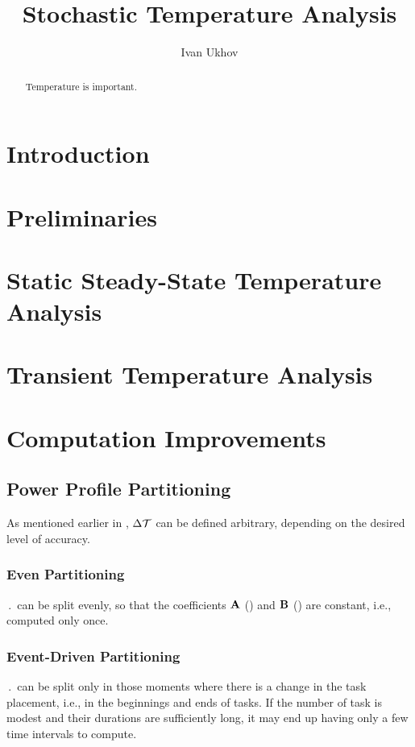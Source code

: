 \documentclass[conference]{IEEEtran}
\begin{document}
  \title{Stochastic Temperature Analysis}
  \author{Ivan Ukhov}

  \maketitle

  \begin{abstract}
    Temperature is important.
  \end{abstract}

  \section{Introduction}  
  

  \section{Preliminaries}
  

  \section{Static Steady-State Temperature Analysis} 
  

  \section{Transient Temperature Analysis} 
  

  \section{Computation Improvements}
  \subsection{Power Profile Partitioning} 
  As mentioned earlier in , $\Delta \mathcal{T}$ can be defined arbitrary, depending on the desired level of accuracy.

  \subsubsection{Even Partitioning}
  $\period$ can be split evenly, so that the coefficients $\mathbf{A}$ () and $\mathbf{B}$ () are constant, i.e., computed only once.

  \subsubsection{Event-Driven Partitioning}
  $\period$ can be split only in those moments where there is a change in the task placement, i.e., in the beginnings and ends of tasks. If the number of task is modest and their durations are sufficiently long, it may end up having only a few time intervals to compute.

  
  
\end{document}

